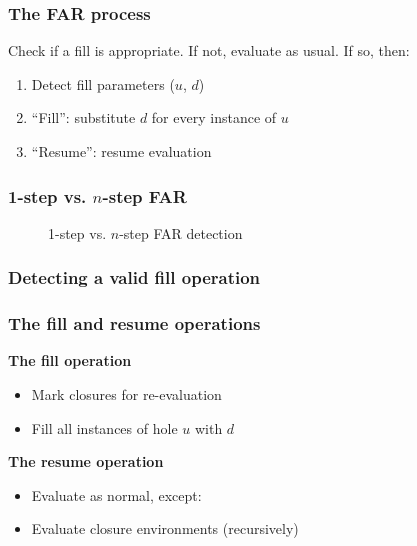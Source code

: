 \documentclass{beamer}
\begin{document}
\begin{frame}
  \frametitle{The FAR process}

  Check if a fill is appropriate. If not, evaluate as usual. If so, then:

  \begin{enumerate}
  \item Detect fill parameters ($u$, $d$)
  \item ``Fill'': substitute $d$ for every instance of $u$
  \item ``Resume'': resume evaluation
  \end{enumerate}
\end{frame}

\begin{frame}
  \frametitle{1-step vs. $n$-step FAR}

  \begin{figure}
    \centering
    \maxsizebox{\textwidth}{15em}{
      
    }
    \caption{1-step vs. $n$-step FAR detection}
    \label{fig:one-vs-n-step-far}
  \end{figure}
\end{frame}

\begin{frame}
  \frametitle{Detecting a valid fill operation}

\end{frame}

\begin{frame}
  \frametitle{The fill and resume operations}

  \centering
  \begin{minipage}[t]{.45\textwidth}
    \textbf{The fill operation}

    \begin{itemize}
    \item Mark closures for re-evaluation
    \item Fill all instances of hole $u$ with $d$
    \end{itemize}
  \end{minipage}
  \qquad
  \begin{minipage}[t]{.45\textwidth}
    \textbf{The resume operation}

    \begin{itemize}
    \item Evaluate as normal, except:
    \item Evaluate closure environments (recursively)
    \end{itemize}
  \end{minipage}
\end{frame}
\end{document}
